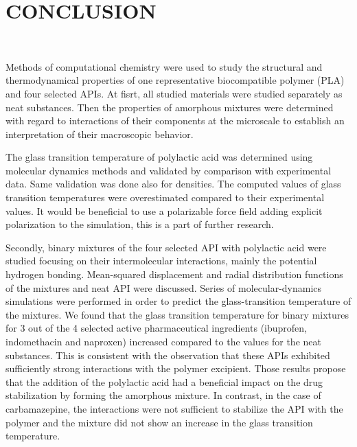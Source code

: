 \clearpage
\section{CONCLUSION}
\

Methods of computational chemistry were used to study the structural and thermodynamical properties of one representative biocompatible polymer (PLA) and four selected APIs. At fisrt, all studied materials were studied separately as neat substances. Then the properties of amorphous mixtures were determined with regard to interactions of their components at the microscale to establish an interpretation of their macroscopic behavior. 

The glass transition temperature of polylactic acid was determined using molecular dynamics methods and validated by comparison with experimental data. Same validation was done also for densities. The computed values of glass transition temperatures were overestimated compared to their experimental values. It would be beneficial to use a polarizable force field adding explicit polarization to the simulation, this is a part of further research.  

Secondly, binary mixtures of the four selected API with polylactic acid were studied focusing on their intermolecular interactions, mainly the potential hydrogen bonding. Mean-squared displacement and radial distribution functions of the mixtures and neat API were discussed. Series of molecular-dynamics simulations were performed in order to predict the glass-transition temperature of the mixtures. We found that the glass transition temperature for binary mixtures for 3 out of the 4 selected active pharmaceutical ingredients (ibuprofen, indomethacin and naproxen) increased compared to the values for the neat substances. This is consistent with the observation that these APIs exhibited sufficiently strong interactions with the polymer excipient. Those results propose that the addition of the polylactic acid had a beneficial impact on the drug stabilization by forming the amorphous mixture. In contrast, in the case of carbamazepine, the interactions were not sufficient to stabilize the API with the polymer and the mixture did not show an increase in the glass transition temperature. 
